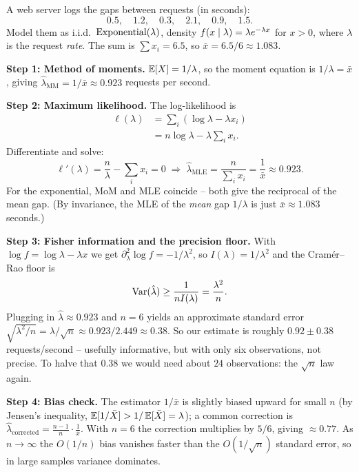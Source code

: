 \begin{example}
\label{ch30:ex-full-expo}
A web server logs the gaps between requests (in seconds):
\[
  0.5,\quad 1.2,\quad 0.3,\quad 2.1,\quad 0.9,\quad 1.5.
\]
Model them as i.i.d.\ $\operatorname{Exponential}(\lambda)$, density $f(x\mid\lambda)=\lambda
e^{-\lambda x}$ for $x>0$, where $\lambda$ is the request \emph{rate}. The sum is
$\sum x_i = 6.5$, so $\bar x = 6.5/6 \approx 1.083$.

\textbf{Step 1: Method of moments.} $\operatorname{\mathbb{E}}[X]=1/\lambda$, so the moment equation is
$1/\lambda=\bar x$, giving $\hat\lambda_{\mathrm{MM}}=1/\bar x \approx 0.923$
requests per second.

\textbf{Step 2: Maximum likelihood.} The log-likelihood is
\begin{align*}
  \ell(\lambda) &= \sum_i (\log\lambda - \lambda x_i) \\
                &= n\log\lambda - \lambda\sum_i x_i.
\end{align*}
Differentiate and solve:
\[
  \ell'(\lambda) = \frac n\lambda - \sum_i x_i = 0
  \;\Longrightarrow\;
  \hat\lambda_{\mathrm{MLE}} = \frac{n}{\sum_i x_i} = \frac{1}{\bar x}
  \approx 0.923.
\]
For the exponential, MoM and MLE coincide -- both give the reciprocal of the
mean gap. (By invariance, the MLE of the \emph{mean} gap $1/\lambda$ is just
$\bar x\approx 1.083$ seconds.)

\textbf{Step 3: Fisher information and the precision floor.} With
$\log f = \log\lambda - \lambda x$ we get $\partial_\lambda^2\log f =
-1/\lambda^2$, so $I(\lambda)=1/\lambda^2$ and the Cram\'er--Rao floor is
\[
  \operatorname{Var}(\hat\lambda) \ge \frac{1}{nI(\lambda)} = \frac{\lambda^2}{n}.
\]
Plugging in $\hat\lambda\approx0.923$ and $n=6$ yields an approximate standard
error $\sqrt{\lambda^2/n}=\lambda/\sqrt n \approx 0.923/2.449 \approx 0.38$. So
our estimate is roughly $0.92 \pm 0.38$ requests/second -- usefully informative,
but with only six observations, not precise. To halve that $0.38$ we would need
about $24$ observations: the $\sqrt n$ law again.

\textbf{Step 4: Bias check.} The estimator $1/\bar x$ is slightly biased upward
for small $n$ (by Jensen's inequality, $\operatorname{\mathbb{E}}[1/\bar X] > 1/\operatorname{\mathbb{E}}[\bar X]=\lambda$); a
common correction is $\hat\lambda_{\text{corrected}}=\frac{n-1}{n}\cdot
\frac{1}{\bar x}$. With $n=6$ the correction multiplies by $5/6$, giving
$\approx 0.77$. As $n\to\infty$ the $O(1/n)$ bias vanishes faster than the
$O(1/\sqrt{n})$ standard error, so in large samples variance dominates.
\end{example}

